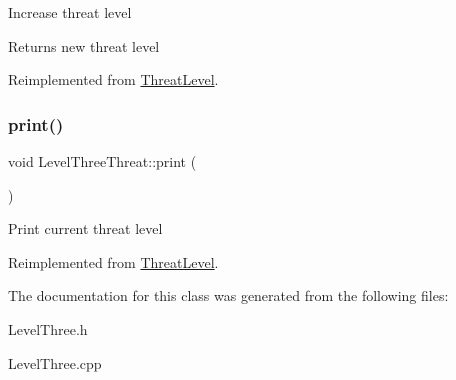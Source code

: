 Increase threat level \begin{DoxyReturn}{Returns}
new threat level 
\end{DoxyReturn}


Reimplemented from \hyperlink{classThreatLevel_ae18f6ebe2186ae1b61d4817196f969e3}{Threat\+Level}.

\mbox{\label{classLevelThreeThreat_a3bdd7e61f3938123ce9c705623e0d98a}} 
\subsubsection{\texorpdfstring{print()}{print()}}
{\footnotesize\ttfamily void Level\+Three\+Threat\+::print (\begin{DoxyParamCaption}{ }\end{DoxyParamCaption})\hspace{0.3cm}{\ttfamily [virtual]}}

Print current threat level 

Reimplemented from \hyperlink{classThreatLevel_a5bdff5eeffed8db616ca06091097c138}{Threat\+Level}.



The documentation for this class was generated from the following files\+:\begin{DoxyCompactItemize}
\item 
Level\+Three.\+h\item 
Level\+Three.\+cpp\end{DoxyCompactItemize}
